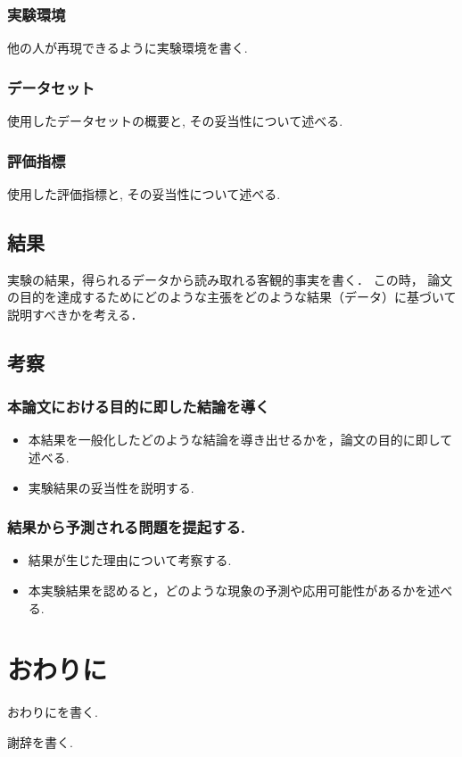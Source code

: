 \documentclass{css}
\begin{document}
\subsubsection{実験環境}
他の人が再現できるように実験環境を書く.

\subsubsection{データセット}
使用したデータセットの概要と, その妥当性について述べる.

\subsubsection{評価指標}
使用した評価指標と, その妥当性について述べる.

\subsection{結果}
実験の結果，得られるデータから読み取れる客観的事実を書く．
この時， 論文の目的を達成するためにどのような主張をどのような結果（データ）に基づいて説明すべきかを考える．

\subsection{考察}

\subsubsection{本論文における目的に即した結論を導く}
\begin{itemize}
    \item 本結果を一般化したどのような結論を導き出せるかを，論文の目的に即して述べる.
    \item 実験結果の妥当性を説明する.
\end{itemize}

\subsubsection{結果から予測される問題を提起する.}
\begin{itemize}
    \item 結果が生じた理由について考察する.
    \item 本実験結果を認めると，どのような現象の予測や応用可能性があるかを述べる.
\end{itemize}

\section{おわりに}
おわりにを書く.

\begin{acknowledgment}
謝辞を書く.
\end{acknowledgment}

\begin{thebibliography}{10}

\end{thebibliography}
\end{document}

